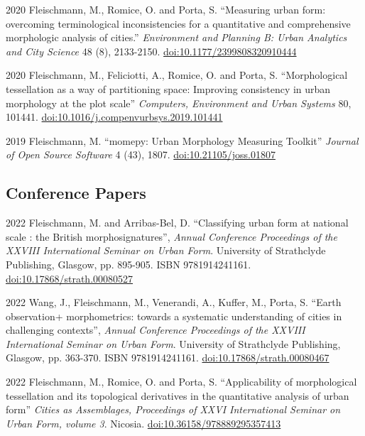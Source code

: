 \documentclass[12pt,a4paper]{report}
\begin{document}
\begin{tablist}
        \item[2020] \tab{}Fleischmann, M., Romice, O. and Porta, S. \enquote{Measuring urban form: overcoming terminological inconsistencies for a quantitative and comprehensive morphologic analysis of cities.} \textit{Environment and Planning B: Urban Analytics and City Science} 48 (8), 2133-2150. \href{https://doi.org/10.1177/2399808320910444}{doi:10.1177/2399808320910444}

        \item[2020] \tab{}Fleischmann, M., Feliciotti, A., Romice, O. and Porta, S. \enquote{Morphological tessellation as a way of partitioning space: Improving consistency in urban morphology at the plot scale} \textit{Computers, Environment and Urban Systems} 80, 101441. \href{https://doi.org/10.1016/j.compenvurbsys.2019.101441}{doi:10.1016/j.compenvurbsys.2019.101441}

        \item[2019] \tab{}Fleischmann, M. \enquote{momepy: Urban Morphology Measuring Toolkit} \textit{Journal of Open Source Software} 4 (43), 1807. \href{https://doi.org/10.21105/joss.01807}{doi:10.21105/joss.01807}


    \end{tablist}

    \subsection*{Conference Papers}

    \begin{tablist}

        \item[2022] \tab{}Fleischmann, M. and Arribas-Bel, D. \enquote{Classifying urban form at national scale : the British morphosignatures}, \textit{Annual Conference Proceedings of the XXVIII International Seminar on Urban Form}. University of Strathclyde Publishing, Glasgow, pp. 895-905. ISBN 9781914241161. \href{https://doi.org/10.17868/strath.00080527}{doi:10.17868/strath.00080527}

        \item[2022] \tab{}Wang, J., Fleischmann, M., Venerandi, A., Kuffer, M., Porta, S. \enquote{Earth observation+ morphometrics: towards a systematic understanding of cities in challenging contexts}, \textit{Annual Conference Proceedings of the XXVIII International Seminar on Urban Form}. University of Strathclyde Publishing, Glasgow, pp. 363-370. ISBN 9781914241161. \href{https://doi.org/10.17868/strath.00080476}{doi:10.17868/strath.00080467}

        \item[2022] \tab{}Fleischmann, M., Romice, O. and Porta, S. \enquote{Applicability of morphological tessellation and its topological derivatives in the quantitative analysis of urban form} \textit{Cities as Assemblages, Proceedings of XXVI International Seminar on Urban Form, volume 3}. Nicosia. \href{https://doi.org/10.36158/978889295357413}{doi:10.36158/978889295357413}

    \end{tablist}
\end{document}
